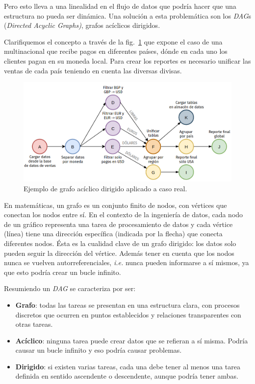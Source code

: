 \documentclass[a4paper,12pt]{article}
\begin{document}
		Pero esto lleva a una linealidad en el flujo de datos que podría hacer que una estructura no pueda ser dinámica. Una solución a esta problemática son los \textit{DAG}s (\textit{Directed Acyclic Graphs)}, grafos acíclicos dirigidos.
						
		Clarifiquemos el concepto a través de la fig.~\ref{fig:dag} que expone el caso de una multinacional que recibe pagos en diferentes países, dónde en cada uno los clientes pagan en su moneda local. Para crear los reportes es necesario unificar las ventas de cada país teniendo en cuenta las diversas divisas.
						
		\begin{figure}[H]
			\begin{center}				
				\includegraphics[width=1\textwidth]{dag.png}
				\caption{Ejemplo de grafo acíclico dirigido aplicado a caso real.}
				\label{fig:dag}
			\end{center}
		\end{figure}
						
		En matemáticas, un grafo es un conjunto finito de nodos, con vértices que conectan los nodos entre sí. En el contexto de la ingeniería de datos, cada nodo de un gráfico representa una tarea de procesamiento de datos y cada vértice (línea) tiene una dirección específica (indicada por la flecha) que conecta diferentes nodos. Ésta es la cualidad clave de un grafo dirigido: los datos solo pueden seguir la dirección del vértice. Además tener en cuenta que los nodos nunca se vuelven autorreferenciales, \textit{i.e.} nunca pueden informarse a sí mismos, ya que esto podría crear un bucle infinito.
						
		Resumiendo un \textit{DAG} se caracteriza por ser:
		\begin{itemize}[noitemsep, topsep=2pt]
			\item \textbf{Grafo}: todas las tareas se presentan en una estructura clara, con procesos discretos que ocurren en puntos establecidos y relaciones transparentes con otras tareas.
			\item \textbf{Acíclico}: ninguna tarea puede crear datos que se refieran a sí misma. Podría causar un bucle infinito y eso podría causar problemas.
			\item \textbf{Dirigido}: si existen varias tareas, cada una debe tener al menos una tarea definida en sentido ascendente o descendente, aunque podría tener ambas.
		\end{itemize}
						
\end{document}
